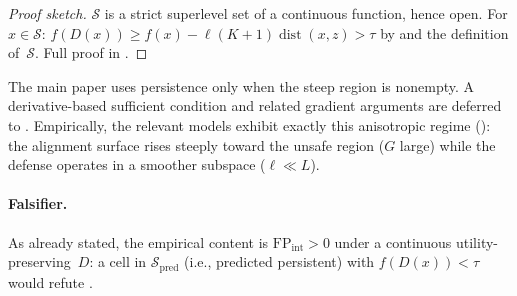 \documentclass[11pt]{article}
\newcommand{\dist}{\operatorname{dist}}
\begin{document}
\begin{proof}[Proof sketch]
$\mathcal{S}$ is a strict superlevel set of a continuous function,
hence open. For $x \in \mathcal{S}$:
$f(D(x)) \geq f(x) - \ell(K+1)\dist(x,z) > \tau$
by  and the definition of~$\mathcal{S}$.
Full proof in .
\end{proof}

The main paper uses persistence only when the steep region is
nonempty. A derivative-based sufficient condition and related gradient
arguments are deferred to . Empirically,
the relevant models exhibit exactly this anisotropic regime
(): the alignment surface rises steeply toward
the unsafe region ($G$ large) while the defense operates in a smoother
subspace ($\ell \ll L$).

\paragraph{Falsifier.}
As already stated, the empirical content is
$\mathrm{FP}_{\mathrm{int}} > 0$ under a continuous
utility-preserving~$D$: a cell in $\mathcal{S}_{\text{pred}}$ (i.e.,
predicted persistent) with $f(D(x)) < \tau$ would refute
.
\end{document}
